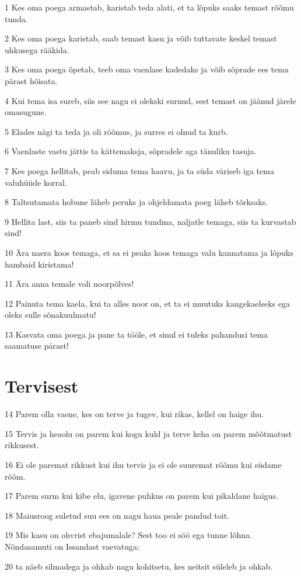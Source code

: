 \par 1 Kes oma poega armastab, karistab teda alati, et ta lõpuks saaks temast rõõmu tunda.
\par 2 Kes oma poega karistab, saab temast kasu ja võib tuttavate keskel temast uhkusega rääkida.
\par 3 Kes oma poega õpetab, teeb oma vaenlase kadedaks ja võib sõprade ees tema pärast hõisata.
\par 4 Kui tema isa sureb, siis see nagu ei olekski surnud, sest temast on jäänud järele omasugune.
\par 5 Elades nägi ta teda ja oli rõõmus, ja surres ei olnud ta kurb.
\par 6 Vaenlaste vastu jättis ta kättemaksja, sõpradele aga tänuliku tasuja.
\par 7 Kes poega hellitab, peab siduma tema haavu, ja ta süda väriseb iga tema valuhüüde korral.
\par 8 Taltsutamata hobune läheb peruks ja ohjeldamata poeg läheb tõrksaks.
\par 9 Hellita last, siis ta paneb sind hirmu tundma, naljatle temaga, siis ta kurvastab sind!
\par 10 Ära naera koos temaga, et sa ei peaks koos temaga valu kannatama ja lõpuks hambaid kiristama!
\par 11 Ära anna temale voli noorpõlves!
\par 12 Painuta tema kaela, kui ta alles noor on, et ta ei muutuks kangekaelseks ega oleks sulle sõnakuulmatu!
\par 13 Kasvata oma poega ja pane ta tööle, et sinul ei tuleks pahandusi tema saamatuse pärast!

\section*{Tervisest}

\par 14 Parem olla vaene, kes on terve ja tugev, kui rikas, kellel on haige ihu.
\par 15 Tervis ja heaolu on parem kui kogu kuld ja terve keha on parem mõõtmatust rikkusest.
\par 16 Ei ole paremat rikkust kui ihu tervis ja ei ole suuremat rõõmu kui südame rõõm.
\par 17 Parem surm kui kibe elu, igavene puhkus on parem kui pikaldane haigus.
\par 18 Maiusroog suletud suu ees on nagu haua peale pandud toit.
\par 19 Mis kasu on ohvrist ebajumalale? Sest too ei söö ega tunne lõhna. Nõndasamuti on Issandast vaevatuga:
\par 20 ta näeb silmadega ja ohkab nagu kohitsetu, kes neitsit süleleb ja ohkab.

